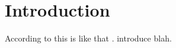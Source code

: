 \section{Introduction}
\label{sec:intro}

According to  this is like that \cite{Kdr2016RepresentationOL}.
 introduce blah.